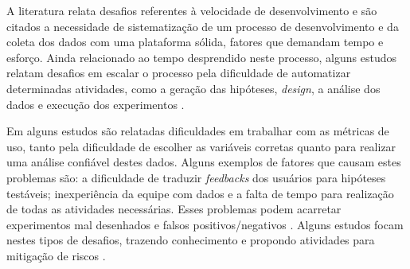 A literatura relata desafios referentes à velocidade de desenvolvimento e são citados a necessidade de sistematização de um processo de desenvolvimento e da coleta dos dados com uma plataforma sólida, fatores que demandam tempo e esforço. Ainda relacionado ao tempo desprendido neste processo, alguns estudos relatam desafios em escalar o processo pela dificuldade de automatizar determinadas atividades, como a geração das hipóteses, \textit{design}, a análise dos dados e execução dos experimentos \cite{erthal_characterization_2023} \cite{fabijan_evolution_2017}  \cite{sauvola_towards_2015} \cite{quin_b_2024} \cite{fernandes_hitting_2015} \cite{fagerholm_right_2017} \cite{kevic_characterizing_2017} \cite{kohavi_online_2013} \cite{bures_infrastructure_2021} \cite{liu_enterprise-level_2019} \cite{chen_automatic_2018} \cite{fabijan_online_2020} \cite{le_goues_towards_2014}.

Em alguns estudos são relatadas dificuldades em trabalhar com as métricas de uso, tanto pela dificuldade de escolher as variáveis corretas quanto para realizar uma análise confiável destes dados. Alguns exemplos de fatores que causam estes problemas são: a dificuldade de traduzir \textit{feedbacks} dos usuários para hipóteses testáveis; inexperiência da equipe com dados e a falta de tempo para realização de todas as atividades necessárias. Esses problemas podem acarretar experimentos mal desenhados e falsos positivos/negativos \cite{quin_b_2024} \cite{erthal_characterization_2023} \cite{issa_mattos_hurrier_2023} \cite{fabijan_evolution_2017} \cite{fernandes_hitting_2015} \cite{fabijan_three_2019} \cite{kuhrmann_activity_2018} \cite{fagerholm_right_2017} \cite{olsson_towards_2015} \cite{kevic_characterizing_2017} \cite{crook_seven_2009} \cite{kohavi_online_2013} \cite{yu_new_2020} \cite{liu_enterprise-level_2019} \cite{kohavi_online_2013} \cite{fabijan_benefits_2017} \cite{le_goues_towards_2014} \cite{larsen_statistical_2024}. Alguns estudos focam nestes tipos de desafios, trazendo conhecimento e propondo atividades para mitigação de riscos \cite{kohavi_seven_2014} \cite{larsen_statistical_2024}.




